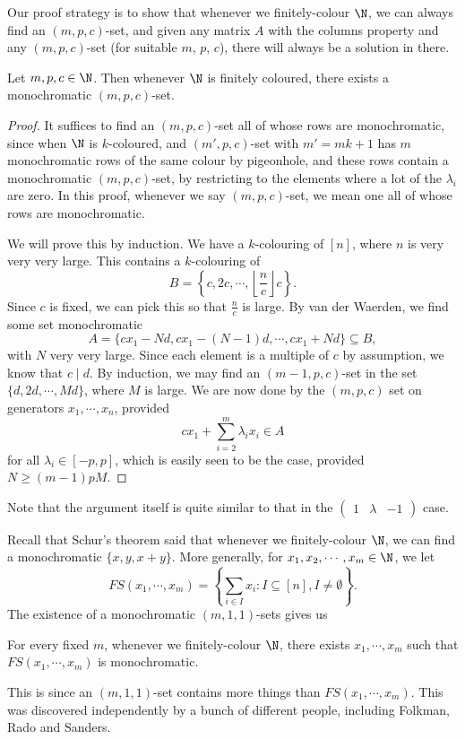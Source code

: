 \documentclass[a4paper]{article}
\begin{document}
Our proof strategy is to show that whenever we finitely-colour $\N$, we can always find an $(m, p, c)$-set, and given any matrix $A$ with the columns property and any $(m, p, c)$-set (for suitable $m$, $p$, $c$), there will always be a solution in there.

\begin{prop}
  Let $m, p, c \in \N$. Then whenever $\N$ is finitely coloured, there exists a monochromatic $(m, p, c)$-set.
\end{prop}

\begin{proof}
  It suffices to find an $(m, p, c)$-set all of whose rows are monochromatic, since when $\N$ is $k$-coloured, and $(m', p, c)$-set with $m' = mk + 1$ has $m$ monochromatic rows of the same colour by pigeonhole, and these rows contain a monochromatic $(m, p, c)$-set, by restricting to the elements where a lot of the $\lambda_i$ are zero. In this proof, whenever we say $(m, p, c)$-set, we mean one all of whose rows are monochromatic.

  We will prove this by induction. We have a $k$-colouring of $[n]$, where $n$ is very very very large. This contains a $k$-colouring of
  \[
    B = \left\{c, 2c, \cdots, \left\lfloor \frac{n}{c}\right\rfloor c\right\}.
  \]
  Since $c$ is fixed, we can pick this so that $\frac{n}{c}$ is large. By van der Waerden, we find some set monochromatic
  \[
    A = \{c x_1 - Nd, cx_1 - (N - 1)d, \cdots, cx_1 + Nd \} \subseteq B,
  \]
  with $N$ very very large. Since each element is a multiple of $c$ by assumption, we know that $c \mid d$. By induction, we may find an $(m - 1, p, c)$-set in the set $\{d, 2d, \cdots, Md\}$, where $M$ is large. We are now done by the $(m, p, c)$ set on generators $x_1, \cdots, x_n$, provided
  \[
    c x_1 + \sum_{i = 2}^m \lambda_i x_i \in A
  \]
  for all $\lambda_i \in [-p, p]$, which is easily seen to be the case, provided $N \geq (m - 1) pM$.
\end{proof}
Note that the argument itself is quite similar to that in the $\begin{pmatrix}1 & \lambda & -1\end{pmatrix}$ case.

Recall that Schur's theorem said that whenever we finitely-colour $\N$, we can find a monochromatic $\{x, y , x + y\}$. More generally, for $x_1, x_2, \cdots, x_m \in \N$, we let
\[
  FS(x_1, \cdots, x_m) = \left\{\sum_{i \in I} x_i : I \subseteq [n], I \not= \emptyset\right\}.
\]
The existence of a monochromatic $(m, 1, 1)$-sets gives us
\begin{cor}
  For every fixed $m$, whenever we finitely-colour $\N$, there exists $x_1, \cdots, x_m$ such that $FS(x_1, \cdots, x_m)$ is monochromatic.
\end{cor}
This is since an $(m, 1, 1)$-set contains more things than $FS(x_1, \cdots, x_m)$. This was discovered independently by a bunch of different people, including Folkman, Rado and Sanders.
\end{document}
